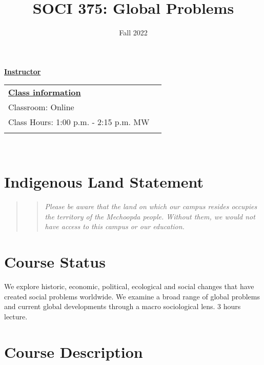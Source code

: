 \documentclass[11pt,]{article}
\title{SOCI 375: Global Problems}
\date{Fall 2022}
\begin{document}
  

		\maketitle
		
	
		\thispagestyle{firststyle}

\textbf{\underline{Instructor}}
\begin{multicols}{2}
  \end{multicols}
	
\noindent \begin{tabular*}{\textwidth}{ @{\extracolsep{\fill}} lr @{\extracolsep{\fill}}}
\textbf{\underline{Class information}}\\
  Classroom: Online\\
  Class Hours: 1:00 p.m. - 2:15 p.m. MW\\
    \\
	\end{tabular*}\\


\vspace{2mm}


\hypertarget{indigenous-land-statement}{%
\section{Indigenous Land Statement}\label{indigenous-land-statement}}

\begin{quote}
\begin{quote}
\emph{Please be aware that the land on which our campus resides occupies
the territory of the Mechoopda people. Without them, we would not have
access to this campus or our education.}
\end{quote}
\end{quote}

\hypertarget{course-status}{%
\section{Course Status}\label{course-status}}

We explore historic, economic, political, ecological and social changes
that have created social problems worldwide. We examine a broad range of
global problems and current global developments through a macro
sociological lens. 3 hours lecture.

\hypertarget{course-description}{%
\section{Course Description}\label{course-description}}
\end{document}
